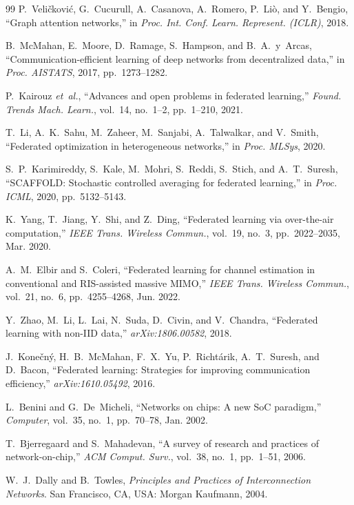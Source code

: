 \documentclass[conference]{IEEEtran}
\begin{document}
\begin{thebibliography}{99}
P.~Veli\v{c}kovi\'{c}, G.~Cucurull, A.~Casanova, A.~Romero, P.~Li\`{o}, and Y.~Bengio, ``Graph attention networks,'' in \emph{Proc. Int. Conf. Learn. Represent. (ICLR)}, 2018.

B.~McMahan, E.~Moore, D.~Ramage, S.~Hampson, and B.~A.~y~Arcas, ``Communication-efficient learning of deep networks from decentralized data,'' in \emph{Proc. AISTATS}, 2017, pp.~1273--1282.

P.~Kairouz \emph{et~al.}, ``Advances and open problems in federated learning,'' \emph{Found. Trends Mach. Learn.}, vol.~14, no.~1--2, pp.~1--210, 2021.

T.~Li, A.~K.~Sahu, M.~Zaheer, M.~Sanjabi, A.~Talwalkar, and V.~Smith, ``Federated optimization in heterogeneous networks,'' in \emph{Proc. MLSys}, 2020.

S.~P.~Karimireddy, S.~Kale, M.~Mohri, S.~Reddi, S.~Stich, and A.~T.~Suresh, ``SCAFFOLD: Stochastic controlled averaging for federated learning,'' in \emph{Proc. ICML}, 2020, pp.~5132--5143.

K.~Yang, T.~Jiang, Y.~Shi, and Z.~Ding, ``Federated learning via over-the-air computation,'' \emph{IEEE Trans. Wireless Commun.}, vol.~19, no.~3, pp.~2022--2035, Mar. 2020.

A.~M.~Elbir and S.~Coleri, ``Federated learning for channel estimation in conventional and RIS-assisted massive MIMO,'' \emph{IEEE Trans. Wireless Commun.}, vol.~21, no.~6, pp.~4255--4268, Jun. 2022.

Y.~Zhao, M.~Li, L.~Lai, N.~Suda, D.~Civin, and V.~Chandra, ``Federated learning with non-IID data,'' \emph{arXiv:1806.00582}, 2018.

J.~Kone\v{c}n\'{y}, H.~B.~McMahan, F.~X.~Yu, P.~Richt\'{a}rik, A.~T.~Suresh, and D.~Bacon, ``Federated learning: Strategies for improving communication efficiency,'' \emph{arXiv:1610.05492}, 2016.

L.~Benini and G.~De~Micheli, ``Networks on chips: A new SoC paradigm,'' \emph{Computer}, vol.~35, no.~1, pp.~70--78, Jan. 2002.

T.~Bjerregaard and S.~Mahadevan, ``A survey of research and practices of network-on-chip,'' \emph{ACM Comput. Surv.}, vol.~38, no.~1, pp.~1--51, 2006.

W.~J.~Dally and B.~Towles, \emph{Principles and Practices of Interconnection Networks}. San Francisco, CA, USA: Morgan Kaufmann, 2004.


\end{thebibliography}
\end{document}
